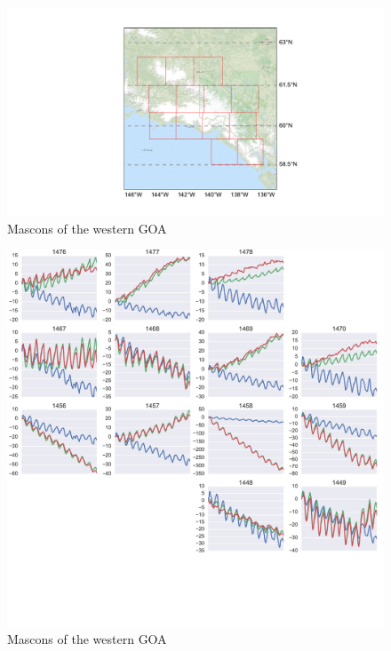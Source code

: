 \documentclass[review,oneside]{igs}
\begin{document}
\begin{figure}
\noindent\includegraphics[width=178mm]{figures/easternMap} \centering \caption{Mascons of the western GOA} \label{fig:summer}
\end{figure}

\begin{figure}
\noindent\includegraphics[width=178mm]{figures/easternPlot} \centering \caption{Mascons of the western GOA} \label{fig:summer}
\end{figure}
\end{document}
